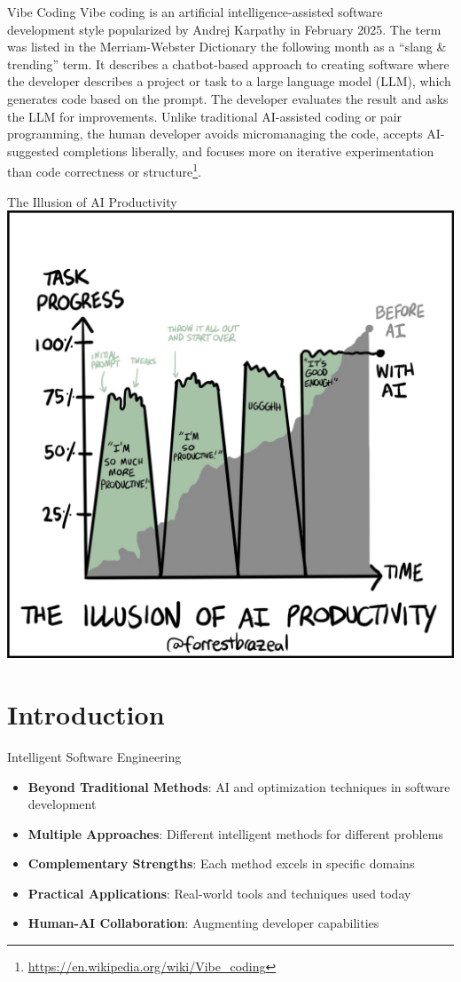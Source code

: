 \documentclass{beamer}
\begin{document}
\begin{frame}[t]{Vibe Coding}
    Vibe coding is an artificial intelligence-assisted software development style popularized by Andrej Karpathy in February 2025. The term was listed in the Merriam-Webster Dictionary the following month as a ``slang \& trending'' term. It describes a chatbot-based approach to creating software where the developer describes a project or task to a large language model (LLM), which generates code based on the prompt. The developer evaluates the result and asks the LLM for improvements. Unlike traditional AI-assisted coding or pair programming, the human developer avoids micromanaging the code, accepts AI-suggested completions liberally, and focuses more on iterative experimentation than code correctness or structure\footnote{\url{https://en.wikipedia.org/wiki/Vibe_coding}}.
\end{frame}

\begin{frame}[t]{The Illusion of AI Productivity}
    \centering
\includegraphics[width=.5\textwidth]{images/before_ai.jpeg} 
\end{frame}

\section{Introduction}
\begin{frame}[t]{Intelligent Software Engineering}
\begin{itemize}
\item \textbf{Beyond Traditional Methods}: AI and optimization techniques in software development
\item \textbf{Multiple Approaches}: Different intelligent methods for different problems
\item \textbf{Complementary Strengths}: Each method excels in specific domains
\item \textbf{Practical Applications}: Real-world tools and techniques used today
\item \textbf{Human-AI Collaboration}: Augmenting developer capabilities
\end{itemize}
\end{frame}
\end{document}
